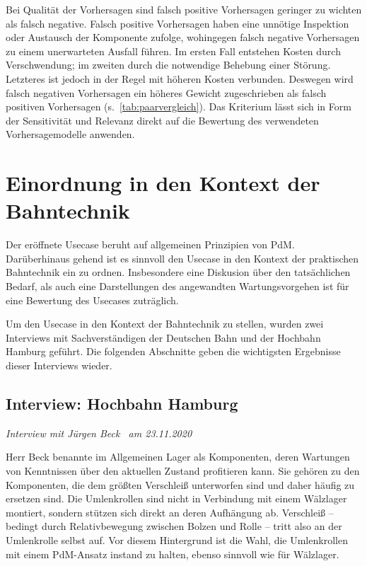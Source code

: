 Bei Qualität der Vorhersagen sind falsch positive Vorhersagen geringer zu wichten als falsch negative. Falsch positive Vorhersagen haben eine unnötige Inspektion oder Austausch der Komponente zufolge, wohingegen falsch negative Vorhersagen zu einem unerwarteten Ausfall führen. Im ersten Fall entstehen Kosten durch Verschwendung; im zweiten durch die notwendige Behebung einer Störung. Letzteres ist jedoch in der Regel mit höheren Kosten verbunden. Deswegen wird falsch negativen Vorhersagen ein höheres Gewicht zugeschrieben als falsch positiven Vorhersagen (s.~\cref{tab:paarvergleich}). Das Kriterium lässt sich in Form der Sensitivität und Relevanz direkt auf die Bewertung des verwendeten Vorhersagemodelle anwenden.
\section{Einordnung in den Kontext der Bahntechnik}
\label{sec:kontext_bahntechnik_von_usecase}
Der eröffnete Usecase beruht auf allgemeinen Prinzipien von PdM. Darüberhinaus gehend ist es sinnvoll den Usecase in den Kontext der praktischen Bahntechnik ein zu ordnen. Insbesondere eine Diskusion über den tatsächlichen Bedarf, als auch eine Darstellungen des angewandten Wartungsvorgehen ist für eine Bewertung des Usecases zuträglich.

Um den Usecase in den Kontext der Bahntechnik zu stellen, wurden zwei Interviews mit Sachverständigen der Deutschen Bahn und der Hochbahn Hamburg geführt. Die folgenden Abschnitte geben die wichtigsten Ergebnisse dieser Interviews wieder.
\subsection{Interview: Hochbahn Hamburg}
\label{subsec:interview_hochbahn}
\textit{Interview mit Jürgen Beck~\cite{hochbahn.2020} am {23.11.2020}}

Herr Beck benannte im Allgemeinen Lager als Komponenten, deren Wartungen von Kenntnissen über den aktuellen Zustand profitieren kann. Sie gehören zu den Komponenten, die dem größten Verschleiß unterworfen sind und daher häufig zu ersetzen sind. Die Umlenkrollen sind nicht in Verbindung mit einem Wälzlager montiert, sondern stützen sich direkt an deren Aufhängung ab. Verschleiß -- bedingt durch Relativbewegung zwischen Bolzen und Rolle -- tritt also an der Umlenkrolle selbst auf. Vor diesem Hintergrund ist die Wahl, die Umlenkrollen mit einem PdM-Ansatz instand zu halten, ebenso sinnvoll wie für Wälzlager.

